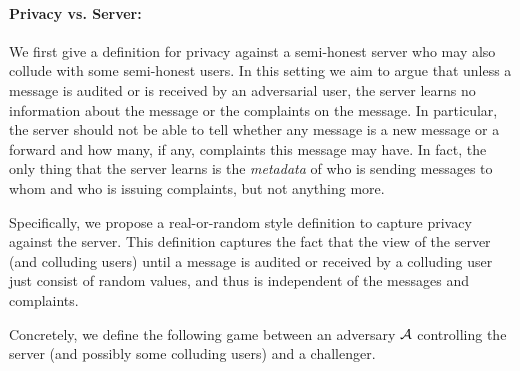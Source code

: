 \paragraph{Privacy vs. Server:}
We first give a definition for privacy against a semi-honest server who may also collude with some semi-honest users.  In this setting we aim to argue that unless a message is audited or is received by an adversarial user, the server learns no information about the message or the complaints on the message.  In particular, the server should not be able to tell whether any message is a new message or a forward and how many, if any, complaints this message may have.  In fact, the only thing that the server learns is the \emph{metadata} of who is sending messages to whom and who is issuing complaints, but not anything more.

Specifically, 
we propose a real-or-random style definition to
capture privacy against the server.  This definition captures the fact that the view of the server (and colluding users) until a message is audited or received by a colluding user just consist of random values, and thus is independent of the messages and complaints.

Concretely, we define the following game between an adversary $\mathcal{A}$ controlling the server (and possibly some colluding users) and a challenger.

